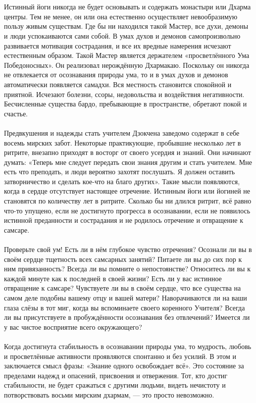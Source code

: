 \\ \\ Истинный йоги никогда не будет основывать и содержать монастыри или Дхарма центры. Тем не менее, он или она естественно осуществляет невообразимую пользу живым существам. Где бы ни находился такой Мастер, все духи, демоны и люди успокаиваются сами собой. В умах духов и демонов самопроизвольно развивается мотивация сострадания, и все их вредные намерения исчезают естественным образом. Такой Мастер является держателем «просветлённого Ума Победоносных». Он реализовал нерождённую Дхармакаю. Поскольку он никогда не отвлекается от осознавания природы ума, то и в умах духов и демонов автоматически появляется самадхи. Вся местность становится спокойной и приятной. Исчезают болезни, ссоры, недовольства и воздействия негативности. Бесчисленные существа бардо, пребывающие в пространстве, обретают покой и счастье.
\\ \\ Предвкушения и надежды стать учителем Дзокчена заведомо содержат в себе восемь мирских забот. Некоторые практикующие, пробывшие несколько лет в ритрите, внезапно приходят в восторг от своего усердия и знаний. Они начинают думать: «Теперь мне следует передать свои знания другим и стать учителем. Мне есть что преподать, и люди вероятно захотят послушать. Я должен оставить затворничество и сделать кое-что на благо других». Такие мысли появляются, когда в сердце отсутствует настоящее отречение. Истинным йоги или йогиней не становятся по количеству лет в ритрите. Сколько бы ни длился ритрит, всё равно что-то упущено, если не достигнуто прогресса в осознавании, если не появилось истинной преданности и сострадания и не родилось отречение и отвращение к самсаре.
\\ \\ Проверьте свой ум! Есть ли в нём глубокое чувство отречения? Осознали ли вы в своём сердце тщетность всех самсарных занятий? Питаете ли вы до сих пор к ним привязанность? Всегда ли вы помните о непостоянстве? Относитесь ли вы к каждой минуте как к последней в своей жизни? Есть ли у вас истинное отвращение к самсаре? Чувствуете ли вы в своём сердце, что все существа на самом деле подобны вашему отцу и вашей матери? Наворачиваются ли на ваши глаза слёзы в тот миг, когда вы вспоминаете своего коренного Учителя? Всегда ли вы присутствуете в пробуждённости осознавания без отвлечений? Имеется ли у вас чистое восприятие всего окружающего?
\\ \\ Когда достигнута стабильность в осознавании природы ума, то мудрость, любовь и просветлённые активности проявляются спонтанно и без усилий. В этом и заключается смысл фразы: «Знание одного освобождает всё». Это состояние за пределами надежд и опасений, присвоения и отвержения. Тот, кто достиг стабильности, не будет сражаться с другими людьми, видеть нечистоту и потворствовать восьми мирским дхармам, — это просто невозможно.
